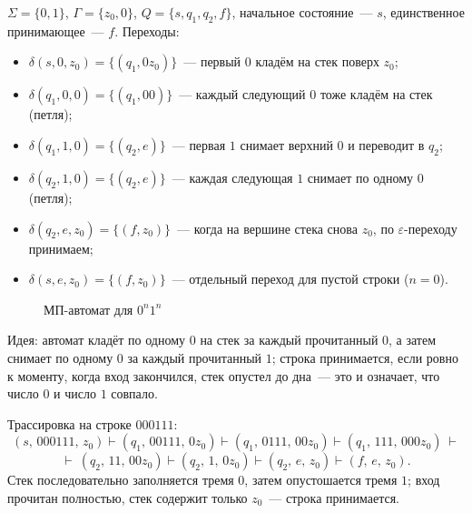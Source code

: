\documentclass[12pt]{article}
\begin{document}
    \begin{example}[$0^n1^n$]
    	$\Sigma = \{0, 1\}$, $\Gamma = \{z_0, 0\}$, $Q = \{s, q_1, q_2, f\}$, начальное состояние~--- $s$, единственное принимающее~--- $f$. Переходы:
    	\begin{itemize}
    		\item $\delta(s, 0, z_0) = \{ (q_1, 0z_0) \}$~--- первый $0$ кладём на стек поверх $z_0$;
    		\item $\delta(q_1, 0, 0) = \{ (q_1, 00) \}$~--- каждый следующий $0$ тоже кладём на стек (петля);
    		\item $\delta(q_1, 1, 0) = \{ (q_2, e) \}$~--- первая $1$ снимает верхний $0$ и переводит в $q_2$;
    		\item $\delta(q_2, 1, 0) = \{ (q_2, e) \}$~--- каждая следующая $1$ снимает по одному $0$ (петля);
    		\item $\delta(q_2, e, z_0) = \{ (f, z_0) \}$~--- когда на вершине стека снова $z_0$, по $\varepsilon$-переходу принимаем;
    		\item $\delta(s, e, z_0) = \{ (f, z_0) \}$~--- отдельный переход для пустой строки ($n = 0$).
    	\end{itemize}
    	
    	\begin{figure}[H]
    		\centering
    		\caption{МП-автомат для $0^n1^n$}
    	\end{figure}
    	
    	Идея: автомат кладёт по одному $0$ на стек за каждый прочитанный $0$, а затем снимает по одному $0$ за каждый прочитанный $1$; строка принимается, если ровно к моменту, когда вход закончился, стек опустел до дна~--- это и означает, что число $0$ и число $1$ совпало.
    	
    	Трассировка на строке $000111$:
    	\[
    	(s,\, 000111,\, z_0) \vdash (q_1,\, 00111,\, 0z_0) \vdash (q_1,\, 0111,\, 00z_0) \vdash (q_1,\, 111,\, 000z_0)\ \vdash
    	\]
    	\[
    	\vdash\ (q_2,\, 11,\, 00z_0) \vdash (q_2,\, 1,\, 0z_0) \vdash (q_2,\, e,\, z_0) \vdash (f,\, e,\, z_0).
    	\]
    	Стек последовательно заполняется тремя $0$, затем опустошается тремя $1$; вход прочитан полностью, стек содержит только $z_0$~--- строка принимается.
    \end{example}
    
\end{document}
